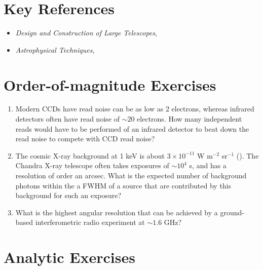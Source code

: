 \section{Key References}

\begin{itemize}
  \item
    {\it Design and Construction of Large Telescopes},
      \citet{bely03a}
  \item
    {\it Astrophysical Techniques},
      \citet{kitchin09a}
\end{itemize}

\section{Order-of-magnitude Exercises}

\begin{enumerate} 
\item Modern CCDs have read noise can be as low as 2 electrons,
    whereas infrared detectors often have read noise of $\sim 20$
    electrons. How many independent reads would have to be performed
    of an infrared detector to beat down the read noise to compete
    with CCD read noise?
\item The cosmic X-ray background at 1 keV is about $3\times 10^{-11}$
    W m$^{-2}$ sr$^{-1}$ (\citealt{fabian92a}). The Chandra X-ray
    telescope often takes exposures of $\sim 10^4$ s, and has a
    resolution of order an arcsec. What is the expected number of
    background photons within the a FWHM of a source that are
    contributed by this background for such an exposure?
\item What is the highest angular resolution that can be achieved by a
    ground-based interferometric radio experiment at $\sim 1.6$ GHz?
\end{enumerate} 

\section{Analytic Exercises}

